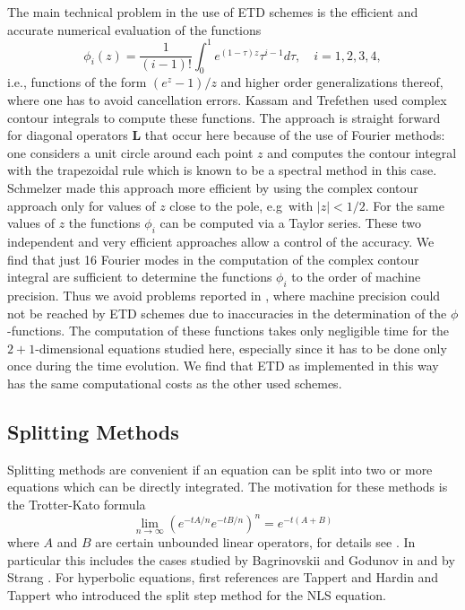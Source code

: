 \documentclass[final]{siamltex}
\begin{document}
The main 
technical problem in the use of  ETD schemes is the efficient and accurate 
numerical evaluation of the functions 
$$    \phi_{i}(z) = 
    \frac{1}{(i-1)!}\int_{0}^{1}e^{(1-\tau)z}\tau^{i-1}d\tau, \quad 
    i=1,2,3,4,$$
i.e., functions of the form $(e^{z}-1)/z$ and higher order 
generalizations thereof, where one has to avoid 
cancellation errors. Kassam and Trefethen \cite{KassT} used complex 
contour integrals to compute these functions. The approach is 
straight forward for diagonal operators $\mathbf{L}$ that occur here 
because of the use of Fourier methods: 
one considers a unit circle around each point $z$ and computes the 
contour integral with the trapezoidal rule which is known to be a 
spectral method in this case. 
Schmelzer \cite{schme} made this approach more efficient by 
using the complex contour approach only for values of $z$ close to 
the pole, e.g\ with 
$|z|<1/2$. For the same values of $z$ the functions $\phi_{i}$ can be 
computed via a Taylor series. These two independent and very 
efficient approaches 
allow a control of the accuracy. We find that just 16 Fourier 
modes in the computation of the 
complex contour integral are sufficient to determine the functions 
$\phi_{i}$ to the order of machine precision. Thus we avoid problems 
reported in \cite{BS}, where machine precision could not be reached 
by ETD schemes due to inaccuracies in the determination of the $\phi$-functions. 
The computation of these functions takes 
only negligible time for the $2+1$-dimensional equations studied here, 
especially since it has to be done only once 
during the time evolution. We find that ETD as implemented in this 
way has the same computational costs as the other used schemes. 




\subsection{Splitting Methods}

Splitting methods are convenient if an equation can be split into two or
more equations which can be directly integrated.
The  motivation for these methods is the Trotter-Kato formula
\cite{TK,Ka}
\begin{equation}\label{e11}
 {\lim}_{n\rightarrow\infty}\left(e^{-tA/n}e^{-tB/n}\right)^{n}=e^{-t\left(A+B\right)}
\end{equation}
where $A$ and $B$ are certain unbounded linear operators, for details 
see \cite{Ka}.
In particular this includes the cases studied by Bagrinovskii and
Godunov in \cite{BG} and by Strang \cite{ST}. For hyperbolic equations,
first references are Tappert \cite{Tap} and Hardin and Tappert \cite{HT}
who introduced the split step method for the NLS
equation.
\end{document}
